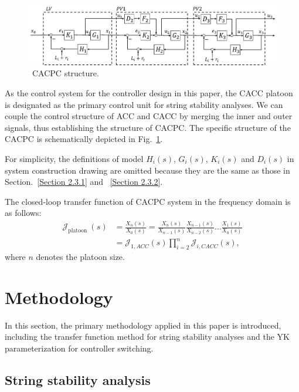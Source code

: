 \documentclass[trsc,nonblindrev]{informs3} %
\begin{document}
\begin{figure}
    \centering
    \includegraphics[width=14cm]{figs/fig3.png}
    \caption{~CACPC structure.}
    \label{fig3}
\end{figure}

As the control system for the controller design in this paper, the CACC platoon is designated as the primary control unit for string stability analyses. We can couple the control structure of ACC and CACC by merging the inner and outer signals, thus establishing the structure of CACPC. The specific structure of the CACPC is schematically depicted in Fig.~\ref{fig3}.

For simplicity, the definitions of model $H_i(s)$, $G_i(s)$, $K_i(s)$ and $D_i(s)$ in system construction drawing are omitted because they are the same as those in Section.~\ref{Section 2.3.1} and ~\ref{Section 2.3.2}.

The closed-loop transfer function of CACPC system in the frequency domain is as follows:
\begin{equation}
    \begin{aligned}
        \mathcal{J}_{\text {platoon }}(s)
         & =\frac{X_{n}(s)}{X_{0}(s)}=\frac{X_{n}(s)}{X_{n-1}(s)} \frac{X_{n-1}(s)}{X_{n-2}(s)} \ldots \frac{X_{1}(s)}{X_{0}(s)} \\
         & =\mathcal{J}_{1, A C C}(s) \prod_{i=2}^{n} \mathcal{J}_{i, C A C C}(s),
    \end{aligned}
    \label{Eq8}
\end{equation}
where $n$ denotes the platoon size.

\section{Methodology}
\label{Section 3}
In this section, the primary methodology applied in this paper is introduced, including the transfer function method for string stability analyses and the YK parameterization for controller switching.

\subsection{String stability analysis}
\label{Section 3.1}
\end{document}
